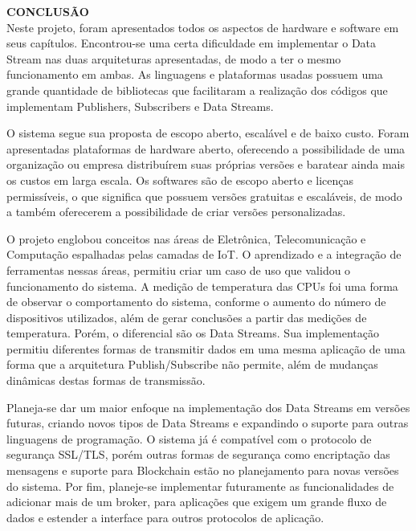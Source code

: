 \noindent\textbf{CONCLUSÃO}
$\!$\\


Neste projeto, foram apresentados todos os aspectos de hardware e software em seus capítulos. Encontrou-se uma certa dificuldade em implementar o Data Stream nas duas arquiteturas apresentadas, de modo a ter o mesmo funcionamento em ambas. As linguagens e plataformas usadas possuem uma grande quantidade de bibliotecas que facilitaram a realização dos códigos que implementam Publishers, Subscribers e Data Streams. 

O sistema segue sua proposta de escopo aberto, escalável e de baixo custo. Foram apresentadas plataformas de hardware aberto, oferecendo a possibilidade de uma organização ou empresa distribuírem suas próprias versões e baratear ainda mais os custos em larga escala. Os softwares são de escopo aberto e licenças permissíveis, o que significa que possuem versões gratuitas e escaláveis, de modo a também oferecerem a possibilidade de criar versões personalizadas.

O projeto englobou conceitos nas áreas de Eletrônica, Telecomunicação e Computação espalhadas pelas camadas de IoT. O aprendizado e a integração de ferramentas nessas áreas, permitiu criar um caso de uso que validou o funcionamento do sistema. A medição de temperatura das CPUs foi uma forma de observar o comportamento do sistema, conforme o aumento do número de dispositivos utilizados, além de gerar conclusões a partir das medições de temperatura. Porém, o diferencial são os Data Streams. Sua implementação permitiu diferentes formas de transmitir dados em uma mesma aplicação de uma forma que a arquitetura Publish/Subscribe não permite, além de mudanças dinâmicas destas formas de transmissão.

Planeja-se dar um maior enfoque na implementação dos Data Streams em versões futuras, criando novos tipos de Data Streams e expandindo o suporte para outras linguagens de programação. O sistema já é compatível com o protocolo de segurança SSL/TLS, porém outras formas de segurança como encriptação das mensagens e suporte para Blockchain estão no planejamento para novas versões do sistema. Por fim, planeje-se implementar futuramente as funcionalidades de adicionar mais de um broker, para aplicações que exigem um grande fluxo de dados e estender a interface para outros protocolos de aplicação.


\pagebreak



